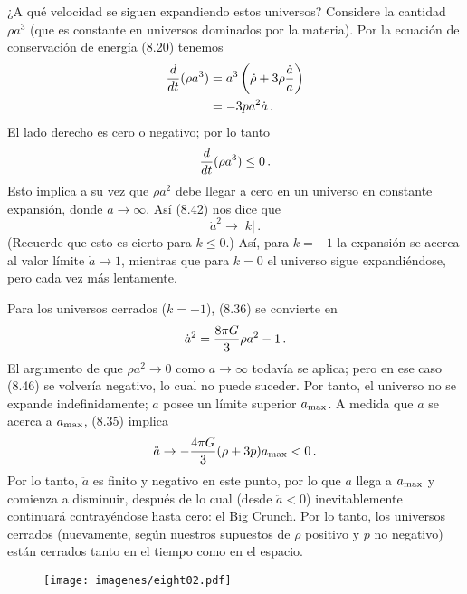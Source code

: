 \documentclass[11pt,b5paper,openany,twoside]{book}
\begin{document}
¿A qué velocidad se siguen expandiendo estos universos? Considere la cantidad $\rho a^3$ (que es constante en universos dominados por la materia).
Por la ecuación de conservación de energía (8.20) tenemos
\begin{align}
{{d}\over {dt}}(\rho a^3)  &=
a^3\left(\dot\rho + 3\rho{{\dot a}\over a}\right) \notag \\
&=  -3p a^2\dot a\,.\label{8.43}
\end{align}
El lado derecho es cero o negativo; por lo tanto
\begin{equation}
{{d}\over {dt}}(\rho a^3)\leq 0\,.\label{8.44}
\end{equation}
Esto implica a su vez que $\rho a^2$ debe llegar a cero en un universo en constante expansión, donde $a\rightarrow\infty$.
Así (8.42) nos dice que
\begin{equation}
\dot a^2\rightarrow |k|\,.\label{8.45}
\end{equation}
(Recuerde que esto es cierto para $k\leq 0$.)
Así, para $k=-1$ la expansión se acerca al valor límite $\dot a\rightarrow 1$, mientras que para $k=0$ el universo sigue expandiéndose, pero cada vez más lentamente.

Para los universos cerrados ($k=+1$), (8.36) se convierte en
\begin{equation}
\dot a^2 = {{8\pi G}\over 3}\rho a^2 -1\,.\label{8.46}
\end{equation}
El argumento de que $\rho a^2\rightarrow 0$ como $a\rightarrow\infty$ todavía se aplica; pero en ese caso (8.46) se volvería negativo, lo cual no puede suceder.
Por tanto, el universo no se expande indefinidamente; $a$ posee un límite superior $a_{\rm max}$.
A medida que $a$ se acerca a $a_{\rm max}$, (8.35) implica
\begin{equation}
\ddot a \rightarrow -{{4\pi G}\over 3}(\rho +3p)a_{\rm max} <0
\,.\label{8.47}
\end{equation}
Por lo tanto, $\ddot a$ es finito y negativo en este punto, por lo que $a$ llega a $a_{\rm max}$ y comienza a disminuir, después de lo cual (desde $\ddot a <0$) inevitablemente continuará contrayéndose hasta cero: el Big Crunch.
Por lo tanto, los universos cerrados (nuevamente, según nuestros supuestos de $\rho$ positivo y $p$ no negativo) están cerrados tanto en el tiempo como en el espacio.

\begin{figure}[h]
\centering
\texttt{[image: imagenes/eight02.pdf]}
\end{figure}
\end{document}
